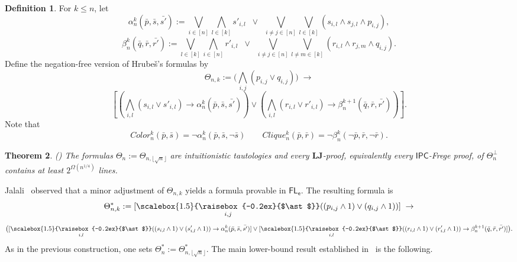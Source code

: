 \documentclass[12pt,a4paper]{article}
\theoremstyle{plain}
\newtheorem{theorem}{Theorem}
\theoremstyle{definition}
\newtheorem{definition}[theorem]{Definition}
\newcommand{\LJ}{\mathbf{LJ}}
\newcommand{\bigast}{\mathop{\scalebox{1.5}{\raisebox{-0.2ex}{$\ast$}}}}%
\begin{document}
\begin{definition} \cite[Definition 6.28]{jerabek} \label{def: alpha beta}
For $k \leq n$, let
\[
\alpha^k_n (\bar{p}, \bar{s}, \bar{s'}) := \bigvee_{i\in [n]} \bigwedge_{l \in [k]} s'_{i,l} \;\;\vee\;\; \bigvee_{i\neq j \in [n]} \bigvee_{l \in [k]} (s_{i,l} \wedge s_{j,l} \wedge p_{i,j}),
\]
\[
\beta^k_n (\bar{q}, \bar{r}, \bar{r'}) := \bigvee_{l \in [k]} \bigwedge_{i \in [n]} r'_{i,l} \;\;\vee\;\; \bigvee_{i \neq j \in [n]} \bigvee_{l \neq m \in [k]} (r_{i,l} \wedge r_{j,m} \wedge q_{i,j}).
\]
Define the negation-free version of Hrube\v{s}'s formulas by
\[
\Theta_{n,k}:=  \big(\bigwedge_{i,j} (p_{i,j} \vee q_{i,j})\big) \; \to 
\]
\[
[
(\bigwedge_{i,l}(s_{i,l} \vee s'_{i,l}) \to \alpha^k_n (\bar{p}, \bar{s}, \bar{s'})) \vee  (\bigwedge_{i,l}(r_{i,l} \vee r'_{i,l}) \to \beta^{k+1}_n (\bar{q}, \bar{r}, \bar{r'}))].
\]
Note that
\[
 Color^k_n(\bar{p}, \bar{s}) = \neg \alpha^k_n(\bar{p}, \bar{s}, \neg \bar{s}) \qquad 
Clique^k_n(\bar{p}, \bar{r}) = \neg \beta^k_n(\neg \bar{p}, \bar{r}, \neg \bar{r}).
\] 
\end{definition}

\begin{theorem}(\cite[Theorem 6.37]{jerabek}) \label{JerabekAsli}
The formulas $\Theta_n := \Theta_{n,\lfloor \sqrt{n} \rfloor}$ are intuitionistic tautologies and every $\LJ$-proof, equivalently every $\mathsf{IPC}$-Frege proof, of $\Theta^{\bot}_n$ contains at least $2^{\Omega(n^{1/4})}$ lines.
\end{theorem}

Jalali~\cite{Raheleh} observed that a minor adjustment of $\Theta_{n, k}$ yields a formula provable in $\mathsf{FL_e}$. The resulting formula is
\[
\Theta^{*}_{n,k}:= [\bigast_{i,j} ((p_{i,j} \wedge 1) \vee (q_{i,j} \wedge 1))] \; \to 
\]
\[
\big([\bigast_{i,l} ((s_{i,l} \wedge 1) \vee (s'_{i,l} \wedge 1)) \to \alpha^k_n (\bar{p}, \bar{s}, \bar{s'})] 
\vee [\bigast_{i,l}((r_{i,l} \wedge 1) \vee  (r'_{i,l} \wedge 1)) \to \beta^{k+1}_n (\bar{q}, \bar{r}, \bar{r'})]\big).
\]
As in the previous construction, one sets
$\Theta^*_n:=\Theta^*_{n,\lfloor\sqrt n\rfloor}$.
The main lower-bound result established in~\cite{Raheleh} is the following.
\end{document}
